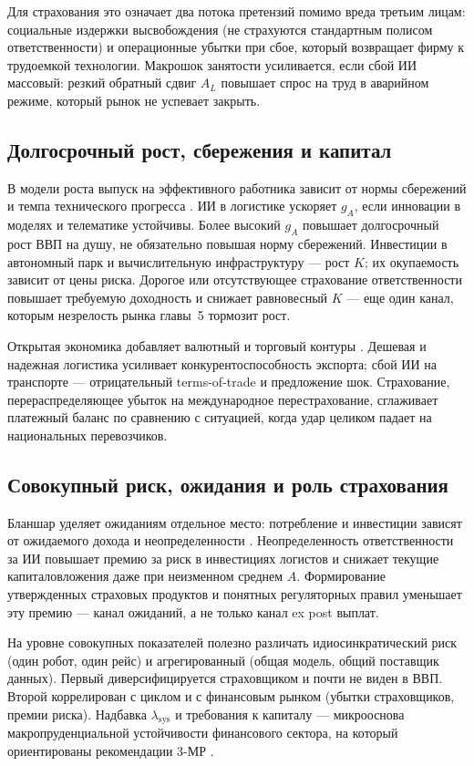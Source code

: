 \documentclass[a4paper,14pt]{extarticle}
\begin{document}
Для страхования это означает два потока претензий помимо вреда третьим лицам: социальные издержки высвобождения (не страхуются стандартным полисом ответственности) и операционные убытки при сбое, который возвращает фирму к трудоемкой технологии. Макрошок занятости усиливается, если сбой ИИ массовый: резкий обратный сдвиг $A_L$ повышает спрос на труд в аварийном режиме, который рынок не успевает закрыть.

\subsection{Долгосрочный рост, сбережения и капитал}

В модели роста выпуск на эффективного работника зависит от нормы сбережений и темпа технического прогресса \cite{blanchard}. ИИ в логистике ускоряет $g_A$, если инновации в моделях и телематике устойчивы. Более высокий $g_A$ повышает долгосрочный рост ВВП на душу, не обязательно повышая норму сбережений. Инвестиции в автономный парк и вычислительную инфраструктуру --- рост $K$; их окупаемость зависит от цены риска. Дорогое или отсутствующее страхование ответственности повышает требуемую доходность и снижает равновесный $K$ --- еще один канал, которым незрелость рынка главы~5 тормозит рост.

Открытая экономика добавляет валютный и торговый контуры \cite{blanchard}. Дешевая и надежная логистика усиливает конкурентоспособность экспорта; сбой ИИ на транспорте --- отрицательный terms-of-trade и предложение шок. Страхование, перераспределяющее убыток на международное перестрахование, сглаживает платежный баланс по сравнению с ситуацией, когда удар целиком падает на национальных перевозчиков.

\subsection{Совокупный риск, ожидания и роль страхования}

Бланшар уделяет ожиданиям отдельное место: потребление и инвестиции зависят от ожидаемого дохода и неопределенности \cite{blanchard}. Неопределенность ответственности за ИИ повышает премию за риск в инвестициях логистов и снижает текущие капиталовложения даже при неизменном среднем $A$. Формирование утвержденных страховых продуктов \cite{zezina} и понятных регуляторных правил \cite{cbr, fz169} уменьшает эту премию --- канал ожиданий, а не только канал ex post выплат.

На уровне совокупных показателей полезно различать идиосинкратический риск (один робот, один рейс) и агрегированный (общая модель, общий поставщик данных). Первый диверсифицируется страховщиком и почти не виден в ВВП. Второй коррелирован с циклом и с финансовым рынком (убытки страховщиков, премии риска). Надбавка $\lambda_{\mathrm{sys}}$ и требования к капиталу --- микрооснова макропруденциальной устойчивости финансового сектора, на который ориентированы рекомендации 3-МР \cite{cbr}.
\end{document}
